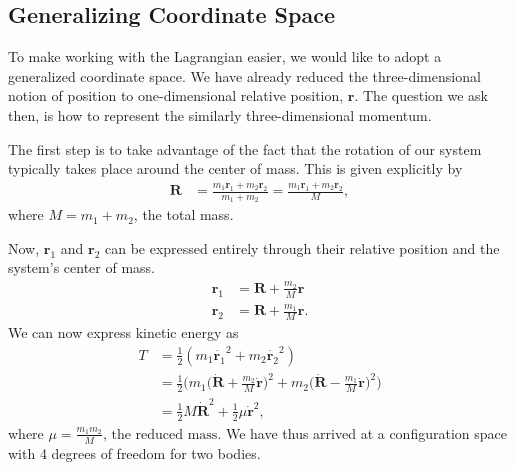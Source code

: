 \documentclass[10pt, psamsfonts]{amsart}
\theoremstyle{definition}
\theoremstyle{remark}
\numberwithin{equation}{section}
\begin{document}
\subsection{Generalizing Coordinate Space} To make working with the Lagrangian
easier, we would like to adopt a generalized coordinate space. We have already
reduced the three-dimensional notion of position to one-dimensional relative
position, $\bm{r}$. The question we ask then, is how to represent the similarly
three-dimensional momentum. 

The first step is to take advantage of the fact that the rotation of our system typically takes place around the center of mass. This is given explicitly by
\begin{align*}
  \bm{R} &= \frac{m_1 \bm{r}_1 + m_2 \bm{r}_2}{m_1 + m_2} 
         = \frac{m_1 \bm{r}_1 + m_2 \bm{r}_2}{M},
\end{align*}
where $M = m_1 + m_2$, the total mass.

\noindent Now, $\bm{r}_1$ and $\bm{r}_2$ can be expressed entirely through their relative position and the system's center of mass.
\begin{align*}
  \bm{r}_1 &= \bm{R} + \frac{m_2}{M} \bm{r} \\
  \bm{r}_2 &= \bm{R} + \frac{m_1}{M} \bm{r}.
\end{align*}
\noindent We can now express kinetic energy as
\begin{align*}
  T & = \frac{1}{2} (m_1 \dot{\bm{r}_1}^2 + m_2 \dot{\bm{r}_2}^2) \\
    & = \frac{1}{2} \bigg(m_1 \bigg(\dot{\bm{R}}+\frac{m_2}{M} \dot{\bm{r}}\bigg)^2 + m_2 \bigg(\dot{\bm{R}} - \frac{m_1}{M} \dot{\bm{r}} \bigg)^2 \bigg)\\
    & = \frac{1}{2} M \dot{\bm{R}}^2 + \frac{1}{2} \mu\dot{\bm{r}}^2,
\end{align*}
where $\mu = \frac{m_1 m_2}{M} \text{, the reduced mass} $.
We have thus arrived at a configuration space with 4 degrees of freedom for two bodies.\\
\end{document}
